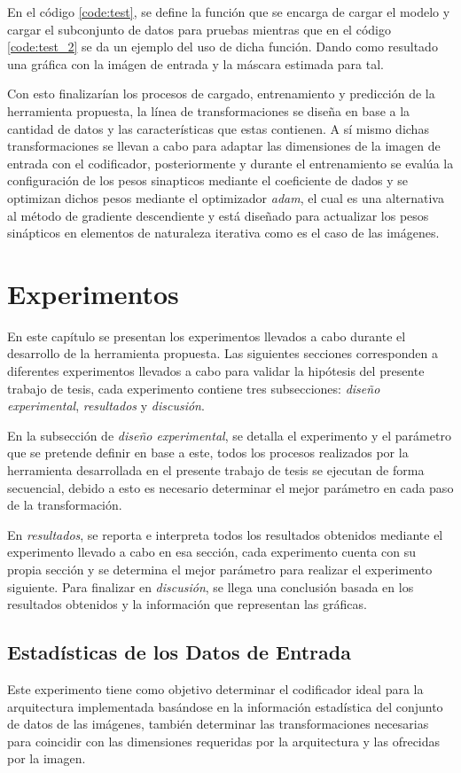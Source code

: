 En el código \ref{code:test}, se define la función que se encarga de cargar el modelo y cargar el subconjunto de datos para pruebas mientras que en el código \ref{code:test_2} se da un ejemplo del uso de dicha función. Dando como resultado una gráfica con la imágen de entrada y la máscara estimada para tal.

Con esto finalizarían los procesos de cargado, entrenamiento y predicción de la herramienta propuesta, la línea de transformaciones se diseña en base a la cantidad de datos y las características que estas contienen. A sí mismo dichas transformaciones se llevan a cabo para adaptar las dimensiones de la imagen de entrada con el codificador, posteriormente y durante el entrenamiento se evalúa la configuración de los pesos sinapticos mediante el coeficiente de dados y se optimizan dichos pesos mediante el optimizador \emph{adam}, el cual es una alternativa al método de gradiente descendiente y está diseñado para actualizar los pesos sinápticos en elementos de naturaleza iterativa como es el caso de las imágenes. 



\chapter{Experimentos}
En este capítulo se presentan los experimentos llevados a cabo durante el desarrollo de la herramienta propuesta. Las siguientes secciones corresponden a diferentes experimentos llevados a cabo para validar la hipótesis del presente trabajo de tesis, cada experimento contiene tres subsecciones: \emph{diseño experimental}, \emph{resultados} y \emph{discusión}.

En la subsección de \emph{diseño experimental}, se detalla el experimento y el parámetro que se pretende definir en base a este, todos los procesos realizados por la herramienta desarrollada en el presente trabajo de tesis se ejecutan de forma secuencial, debido a esto es necesario determinar el mejor parámetro en cada paso de la transformación.

En \emph{resultados}, se reporta e interpreta todos los resultados obtenidos mediante el experimento llevado a cabo en esa sección, cada experimento cuenta con su propia sección y se determina el mejor parámetro para realizar el experimento siguiente. Para finalizar en \emph{discusión}, se llega una conclusión basada en los resultados obtenidos y la información que representan las gráficas.


\section{Estadísticas de los Datos de Entrada} 
Este experimento tiene como objetivo determinar el codificador ideal para la arquitectura implementada basándose en la información estadística del conjunto de datos de las imágenes, también determinar las transformaciones necesarias para coincidir con las dimensiones requeridas por la arquitectura y las ofrecidas por la imagen.

